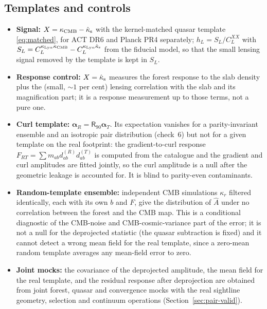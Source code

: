\documentclass[11pt,a4paper]{article}
\newcommand{\kcmb}{\kappa_{\rm CMB}}
\newcommand{\klya}{\kappa_{{\rm Ly}\alpha}}
\begin{document}
\subsection{Templates and controls}
\begin{itemize}
\item \textbf{Signal:} $X=\kcmb-\hat\kappa_{\rm s}$ with the kernel-matched quasar template \eqref{eq:matched}, for ACT DR6 and Planck PR4 separately; $h_L=S_L/C^{XX}_L$ with $S_L=C^{\klya\kcmb}_L-C^{\klya\hat\kappa_{\rm s}}_L$ from the fiducial model, so that the small lensing signal removed by the template is kept in $S_L$.
\item \textbf{Response control:} $X=\hat\kappa_{\rm s}$ measures the forest response to the slab density plus the (small, $\sim1$ per cent) lensing correlation with the slab and its magnification part; it is a response measurement up to those terms, not a pure one.
\item \textbf{Curl template:} $\bm\alpha_R=\mathsf R_{90}\bm\alpha_T$. Its expectation vanishes for a parity-invariant ensemble and an isotropic pair distribution (check~6) but not for a given template on the real footprint: the gradient-to-curl response $F_{RT}=\sum m_{ab}d^{(R)}_{ab}d^{(T)}_{ab}$ is computed from the catalogue and the gradient and curl amplitudes are fitted jointly, so the curl amplitude is a null after the geometric leakage is accounted for. It is blind to parity-even contaminants.
\item \textbf{Random-template ensemble:} independent CMB simulations $\kappa_r$ filtered identically, each with its own $b$ and $F$, give the distribution of $\hat A$ under no correlation between the forest and the CMB map. This is a conditional diagnostic of the CMB-noise and CMB-cosmic-variance part of the error; it is not a null for the deprojected statistic (the quasar subtraction is fixed) and it cannot detect a wrong mean field for the real template, since a zero-mean random template averages any mean-field error to zero.
\item \textbf{Joint mocks:} the covariance of the deprojected amplitude, the mean field for the real template, and the residual response after deprojection are obtained from joint forest, quasar and convergence mocks with the real sightline geometry, selection and continuum operations (Section~\ref{sec:pair-valid}).
\end{itemize}
\end{document}
